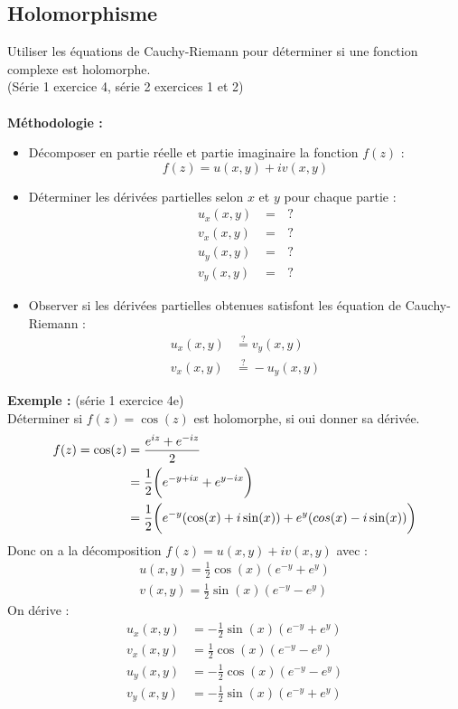 \subsection{Holomorphisme}
Utiliser les équations de Cauchy-Riemann pour déterminer si une fonction complexe est holomorphe. \\
(Série 1 exercice 4, série 2 exercices 1 et 2) \\
\\
\textbf{Méthodologie :}
\begin{itemize}
    \item Décomposer en partie réelle et partie imaginaire la fonction $f(z)$ :
    $$f(z) = u(x,y) + iv(x,y)$$
    \item Déterminer les dérivées partielles selon $x$ et $y$ pour chaque partie :
    \begin{align*}
    u_x(x,y) &= \text{ }? \\
    v_x(x,y) &= \text{ }? \\
    u_y(x,y) &= \text{ }? \\
    v_y(x,y) &= \text{ }?
    \end{align*}
    \item Observer si les dérivées partielles obtenues satisfont les équation de Cauchy-Riemann :
    \begin{align*}
    u_x(x,y) &\overset{?}{=} v_y(x,y) \\
    v_x(x,y) &\overset{?}{=} -u_y(x,y)
    \end{align*}
\end{itemize}
\textbf{Exemple : }(série 1 exercice 4e)\\
Déterminer si $f(z) = \cos(z)$ est holomorphe, si oui donner sa dérivée.
\begin{align*}
    f(z) = \cos(z) &= \frac{e^{iz} + e^{-iz}}{2} \\
    &= \frac{1}{2} \bigg{(} e^{-y+ix} + e^{y-ix} \bigg{)} \\
    &= \frac{1}{2} \bigg{(} e^{-y}(\cos(x) +i\sin(x)) + e^y(cos(x) - i\sin(x)) \bigg{)}
\end{align*}
Donc on a la décomposition $f(z) = u(x,y) + iv(x,y)$ avec :
\begin{align*}
    u(x,y) = \frac{1}{2} \cos(x)(e^{-y} + e^y) \\
    v(x,y) = \frac{1}{2} \sin(x)(e^{-y} - e^y)
\end{align*}
On dérive :
\begin{align*}
    u_x(x,y) &= -\frac{1}{2} \sin(x)(e^{-y} + e^y) \\
    v_x(x,y) &= \frac{1}{2} \cos(x)(e^{-y} - e^y) \\
    u_y(x,y) &= -\frac{1}{2} \cos(x)(e^{-y} - e^y) \\
    v_y(x,y) &= -\frac{1}{2} \sin(x)(e^{-y} + e^y)
\end{align*}
